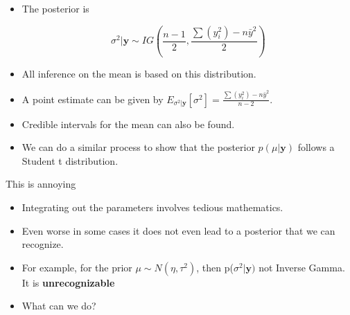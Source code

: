 \documentclass[10pt]{beamer}
\begin{document}
\begin{frame}
  \begin{itemize}
  \item The posterior is

    \begin{equation}
      \sigma^2|{\bm y}\sim IG\left(\frac{n-1}{2},\frac{\sum(y_i^2)-n\bar{y}^2}{2}\right)
    \end{equation}

  \item All inference on the mean is based on this distribution.

  \item A point estimate can be given by $E_{\sigma^2|{\bm y}}[\sigma^2]=\frac{\sum(y_i^2)-n\bar{y}^2}{n-2}$.

  \item Credible intervals for the mean can also be found.

  \item We can do a similar process to show that the posterior $p(\mu|{\bm y})$ follows a Student t distribution.
  \end{itemize}
\end{frame}
\begin{frame}{This is annoying}
  \begin{itemize}
  \item Integrating out the parameters involves tedious mathematics.

  \item Even worse in some cases it does not even lead to a posterior that we can recognize.

  \item For example, for the prior $\mu\sim N(\eta,\tau^2)$, then p($\sigma^2|{\bm y})$ not Inverse Gamma.  It is {\bf unrecognizable}

  \item What can we do?
  \end{itemize}
\end{frame}
\end{document}
